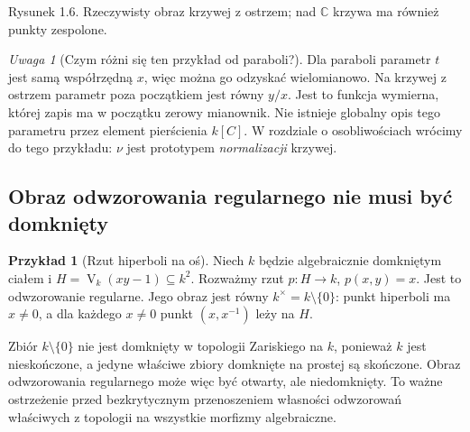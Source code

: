 \documentclass[11pt,a4paper,openany]{report}
\numberwithin{equation}{section}
\theoremstyle{plain}
\theoremstyle{definition}
\newtheorem{przyklad}[twierdzenie]{Przykład}
\theoremstyle{remark}
\newtheorem{uwaga}[twierdzenie]{Uwaga}
\newcommand{\C}{\mathbb C}
\newcommand{\V}{\operatorname V}
\begin{document}
\begin{center}
\end{center}
\begin{center}\small Rysunek 1.6. Rzeczywisty obraz krzywej z ostrzem; nad $\C$ krzywa ma również punkty zespolone.\end{center}

\begin{uwaga}[Czym różni się ten przykład od paraboli?]
Dla paraboli parametr $t$ jest samą współrzędną $x$,
więc można go odzyskać wielomianowo. Na krzywej z ostrzem
parametr poza początkiem jest równy $y/x$.
Jest to funkcja wymierna, której zapis ma w początku
zerowy mianownik. Nie istnieje globalny opis tego parametru
przez element pierścienia $k[C]$.
W rozdziale o osobliwościach wrócimy do tego przykładu:
$\nu$ jest prototypem \emph{normalizacji} krzywej.
\end{uwaga}

\subsection{Obraz odwzorowania regularnego nie musi być domknięty}

\begin{przyklad}[Rzut hiperboli na oś]
Niech $k$ będzie algebraicznie domkniętym ciałem i
$H=\V_k(xy-1)\subseteq k^2$.
Rozważmy rzut $p:H\to k$, $p(x,y)=x$.
Jest to odwzorowanie regularne. Jego obraz jest równy
$k^\times=k\setminus\{0\}$: punkt hiperboli ma $x\ne0$,
a dla każdego $x\ne0$ punkt $(x,x^{-1})$ leży na $H$.

Zbiór $k\setminus\{0\}$ nie jest domknięty w topologii
Zariskiego na $k$, ponieważ $k$ jest nieskończone,
a jedyne właściwe zbiory domknięte na prostej są skończone.
Obraz odwzorowania regularnego może więc być otwarty, ale niedomknięty.
To ważne ostrzeżenie przed bezkrytycznym przenoszeniem własności
odwzorowań właściwych z topologii na wszystkie morfizmy algebraiczne.
\end{przyklad}
\end{document}
